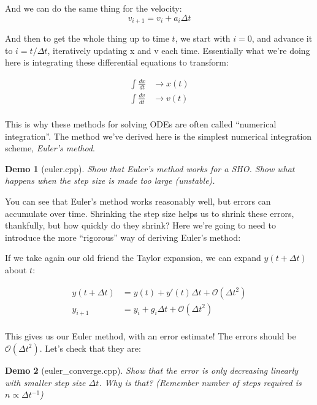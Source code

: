 \documentclass{article}
\theoremstyle{demo}
\newtheorem{demo}{Demo}[section]
\begin{document}
And we can do the same thing for the velocity:
\begin{equation}
    v_{i+1} = v_i + a_i \Delta t
\end{equation}

And then to get the whole thing up to time $t$, we start with $i=0$, and advance
it to $i=t/\Delta t$, iteratively updating x and v each time.  Essentially what
we're doing here is integrating these differential equations to transform:

\begin{equation}
    \begin{aligned}
        \int \frac{dx}{dt} &\rightarrow x(t) \\
        \int \frac{dv}{dt} &\rightarrow v(t) \\
    \end{aligned}
\end{equation}

This is why these methods for solving ODEs are often called ``numerical
integration''.  The method we've derived here is the simplest numerical
integration scheme, \textit{Euler's method}.

\begin{demo}[euler.cpp]
    Show that Euler's method works for a SHO.  Show what happens when the step
    size is made too large (unstable).
\end{demo}

You can see that Euler's method works reasonably well, but errors can accumulate
over time.  Shrinking the step size helps us to shrink these errors, thankfully,
but how quickly do they shrink?  Here we're going to need to introduce the more
``rigorous'' way of deriving Euler's method:

If we take again our old friend the Taylor expansion, we can expand $y(t+\Delta
t)$ about $t$:

\begin{equation}
    \begin{aligned}
        y(t+\Delta t) &= y(t) + y'(t)\Delta t + \mathcal{O}(\Delta t^2)\\
        y_{i+1} &= y_i + g_{i}\Delta t + \mathcal{O}(\Delta t^2)\\
    \end{aligned}
\end{equation}

This gives us our Euler method, with an error estimate!  The errors should be
$\mathcal{O}(\Delta t^2)$.  Let's check that they are:

\begin{demo}[euler\_converge.cpp]
    Show that the error is only decreasing linearly with smaller step size
    $\Delta t$.  Why is that?  (Remember number of steps required is $n\propto
    \Delta t^{-1}$)
\end{demo}
\end{document}
